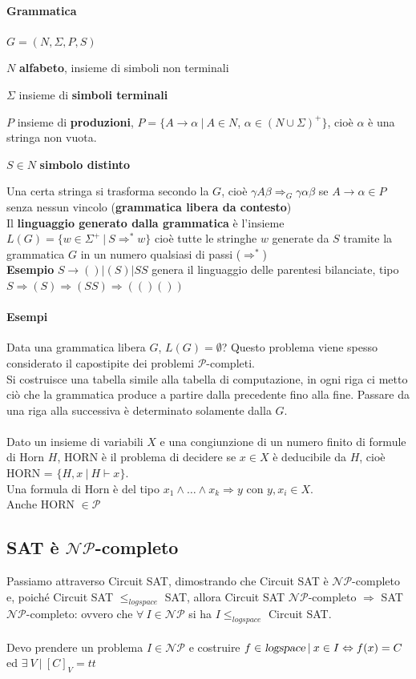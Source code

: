 \documentclass[10pt]{book}
\begin{document}
\paragraph{Grammatica} $G = (N, \Sigma, P, S)$
\begin{list}{}{}
	\item $N$ \textbf{alfabeto}, insieme di simboli non terminali
	\item $\Sigma$ insieme di \textbf{simboli terminali}
	\item $P$ insieme di \textbf{produzioni}, $P = \{A\rightarrow\alpha\:|\:A\in N$, $\alpha\in(N\cup\Sigma)^+\}$, cioè $\alpha$ è una stringa non vuota.
	\item $S \in N$ \textbf{simbolo distinto}
\end{list}
Una certa stringa si trasforma secondo la $G$, cioè $\gamma A\beta \Rightarrow_G \gamma\alpha\beta$ se $A \rightarrow \alpha \in P$ senza nessun vincolo (\textbf{grammatica libera da contesto})\\
Il \textbf{linguaggio generato dalla grammatica} è l'insieme $L(G) = \{w\in\Sigma^+ \:|\:S\Rightarrow^* w\}$ cioè tutte le stringhe $w$ generate da $S$ tramite la grammatica $G$ in un numero qualsiasi di passi ($\Rightarrow^*$)\\
\textbf{Esempio} $S \rightarrow () | (S) | SS$ genera il linguaggio delle parentesi bilanciate, tipo $S \Rightarrow (S) \Rightarrow (SS) \Rightarrow (()())$
\paragraph{Esempi} Data una grammatica libera $G$, $L(G) = \emptyset$? Questo problema viene spesso considerato il capostipite dei problemi $\mathscr{P}$-completi.\\
Si costruisce una tabella simile alla tabella di computazione, in ogni riga ci metto  ciò che la grammatica produce a partire dalla precedente fino alla fine. Passare da una riga alla successiva è determinato solamente dalla $G$.\\\\
Dato un insieme di variabili $X$ e una congiunzione di un numero finito di formule di Horn $H$, HORN è il problema di decidere se $x\in X$ è deducibile da $H$, cioè HORN = $\{H, x\:|\:H\vdash x\}$.\\
Una formula di Horn è del tipo $x_1\wedge\ldots\wedge x_k \Rightarrow y$ con $y, x_i \in X$.\\
Anche HORN $\in \mathscr{P}$
\pagebreak
\subsection{SAT è $\mathscr{NP}$-completo}
Passiamo attraverso Circuit SAT, dimostrando che Circuit SAT è $\mathscr{NP}$-completo e, poiché Circuit SAT $\leq_{logspace}$ SAT, allora Circuit SAT $\mathscr{NP}$-completo $\Rightarrow$ SAT $\mathscr{NP}$-completo: ovvero che $\forall\:I\in\mathscr{NP}$ si ha $I \leq_{logspace}$ Circuit SAT.\\\\
Devo prendere un problema $I \in \mathscr{NP}$ e costruire $f\in\textsl{logspace}\:|\:x\in I\Leftrightarrow f(x) = C$ ed $\exists\:V\:|\:[C]_V = tt$
\end{document}
